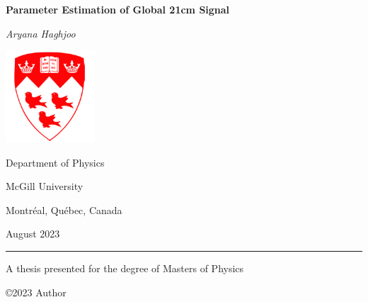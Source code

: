 \documentclass[12pt, TexShade, letterpaper]{report}
\author{\textcopyright Author, August, 2020}
\date{}
\renewcommand{\chaptermark}[1]{\markboth{#1}{}} %
\begin{document}
\begin{titlepage}
		\begin{center}
			\vspace*{0.5cm}

			\LARGE
			\textbf{Parameter Estimation of Global 21cm Signal}
			\vspace{1cm}
			
			\textit{Aryana Haghjoo}
			
			\vspace{1.2cm}
			
			\includegraphics[width=0.25\textwidth]{mcglogo.png}
			
			\Large
			Department of Physics
			
			\vspace{-5mm}
			McGill University
			
			\vspace{-5mm}
			Montr\'eal, Qu\'ebec, Canada
			
			\vspace{5mm}
			August 2023
			\small
			\vspace{0.5cm}
			{\color{red} \hrule height 0.75mm}
			
			\vspace{0.2cm}
			
			A thesis presented for the degree of
			Masters of Physics
		
			\copyright\hspace{0.5mm}2023 Author
			
		\end{center}
	\end{titlepage}
\setlength{\voffset}{2cm}
\renewcommand{\chaptermark}[1]{%
	\markboth{\thechapter.\ #1}{}}
\end{document}
